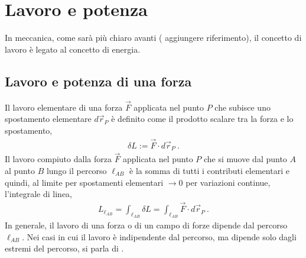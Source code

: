 \documentclass[letterpaper,10pt,italian]{jupyterBook}
\begin{document}
\section{Lavoro e potenza}
\label{\detokenize{ch/mechanics/actions-work:lavoro-e-potenza}}\label{\detokenize{ch/mechanics/actions-work:physics-hs-mechanics-actions-work}}\label{\detokenize{ch/mechanics/actions-work::doc}}
\sphinxAtStartPar
In meccanica, come sarà più chiaro avanti ( aggiungere riferimento), il concetto di lavoro è legato al concetto di energia. 


\subsection{Lavoro e potenza di una forza}
\label{\detokenize{ch/mechanics/actions-work:lavoro-e-potenza-di-una-forza}}
\sphinxAtStartPar
{} Il lavoro elementare di una forza \(\vec{F}\) applicata nel punto \(P\) che subisce uno spostamento elementare \(d \vec{r}_P\) è definito come il prodotto scalare tra la forza e lo spostamento,
\begin{equation*}
\begin{split}\delta L := \vec{F} \cdot d \vec{r}_P \ .\end{split}
\end{equation*}
\sphinxAtStartPar
Il lavoro compiuto dalla forza \(\vec{F}\) applicata nel punto \(P\) che si muove dal punto \(A\) al punto \(B\) lungo il percorso \(\ell_{AB}\) è la somma di tutti i contributi elementari \sphinxhyphen{} e quindi, al limite per spostamenti elementari \(\rightarrow 0\) per variazioni continue, l’integrale di linea,
\begin{equation*}
\begin{split}L_{\ell_{AB}} = \int_{\ell_{AB}} \delta L = \int_{\ell_{AB}} \vec{F} \cdot d \vec{r}_{P} \ .\end{split}
\end{equation*}
\sphinxAtStartPar
In generale, il lavoro di una forza o di un campo di forze dipende dal percorso \({\ell}_{AB}\). Nei casi in cui il lavoro è indipendente dal percorso, ma dipende solo dagli estremi del percorso, si parla di {\hyperref[\detokenize{ch/mechanics/actions-conservative:physics-hs-mechanics-actions-conservative}]{}}.
\end{document}
